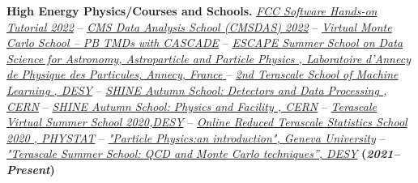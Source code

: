 \documentclass[11pt]{res}
\begin{document}
\begin{resume}
\textbf{High Energy Physics/Courses and Schools.}
\href{https://indico.cern.ch/event/1182767/}{\textit{FCC Software Hands-on Tutorial 2022}} -- \href{https://lpc.fnal.gov/programs/schools-workshops/cmsdas.shtml}{\textit{CMS Data Analysis School (CMSDAS) 2022}} -- \href{https://drive.google.com/file/d/1Ui4phtxuFPd-trfQp6jCmL4qZOgEJvlf/view}{\textit{Virtual Monte Carlo School -- PB TMDs with CASCADE}} -- \href{https://drive.google.com/file/d/1D9BjE1nlL8UmRmZ3HQNqC6Cq1OxK0zB-/view?usp=sharing}{\textit{ESCAPE Summer School on Data Science for Astronomy, Astroparticle and Particle Physics , Laboratoire d’Annecy de Physique des Particules, Annecy, France }} -- \href{https://drive.google.com/file/d/11AAS10GLKvA5oR2oZmcjLj1YBwBevQue/view?usp=sharing}{\textit{2nd Terascale School of Machine Learning , DESY}} -- \href{https://indico.cern.ch/event/964916/overview}{\textit{SHINE Autumn School: Detectors and Data Processing , CERN}} -- \href{https://indico.cern.ch/event/963826/}{\textit{SHINE Autumn School: Physics and Facility , CERN}} -- \href{https://indico.desy.de/event/26403/}{\textit{Terascale Virtual Summer School 2020,DESY}} -- \href{https://indico.desy.de/event/25594/}{\textit{Online Reduced Terascale Statistics School 2020 , PHYSTAT}} -- \href{https://www.coursera.org/account/accomplishments/certificate/CMVH65UHPLR3}{\textit{"Particle Physics:an introduction", Geneva University}} -- \href{https://drive.google.com/file/d/1fxuisoVa6oLr7eA6mWlE-xZxAs_ifsk6/view}{\textit{"Terascale Summer School: QCD and Monte Carlo techniques”, DESY}} \textbf{(\textit{2021--Present})}



\end{resume}
\end{document}
